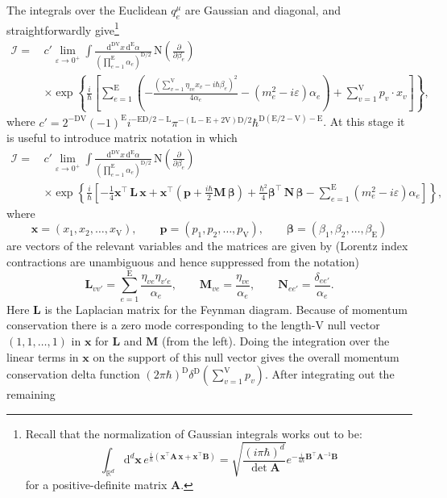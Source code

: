 \documentclass[12pt]{article}
\numberwithin{figure}{section}
\def \be {\begin{equation}}
\def \ee {\end{equation}}
\def \nn {\nonumber}
\def \R {\mathbb{R}}
\def \D {\mathrm{D}}
\def \E {\mathrm{E}}
\def \L {\mathrm{L}}
\def \d {\mathrm{d}}
\def \eps {\varepsilon}
\def \I {\mathcal{I}}
\def \NN {\mathrm{N}}
\def \VV {\mathrm{V}}
\begin{document}
The integrals over the Euclidean $q_e^\mu$ are Gaussian and diagonal, and straightforwardly give\footnote{
Recall that the normalization of Gaussian integrals works out to be:
		\be
		\int_{\R^d} \!\!\!\d^d \mathbf{x}\, e^{\frac{i}{\hbar} \left(\mathbf{x}^\intercal \mathbf{A}\, \mathbf{x} + \mathbf{x}^\intercal \mathbf{B} \right)} = \sqrt{\frac{(i\pi\hbar)^{d}}{\det \mathbf{A}}} e^{-\frac{i}{4\hbar} \mathbf{B}^\intercal \mathbf{A}^{-1} \mathbf{B}}
		\ee
		for a positive-definite
		matrix
		$\mathbf{A}$.
	}
%
\begin{align}\label{eq:int2}
\I = \,& c' \lim_{\eps \to 0^+} \int \!\!\frac{\d^{\D\mathrm{V}} x \, \d^{\E}\alpha}{(\prod_{e=1}^{\E} \!\alpha_e)^{\D/2}}\, \NN(\tfrac{\partial}{\partial \beta_{e}})\\
& \times \exp \left\{ \frac{i}{\hbar}\left[\sum_{e=1}^{\E} \left(- \frac{(\sum_{v=1}^{\mathrm{V}} \eta_{ve} x_v - i\hbar\beta_e)^2}{4\alpha_e} - (m_e^2 - i\eps) \alpha_e \right) + \sum_{v=1}^{\mathrm{V}} p_v {\cdot} x_v \right] \right\} ,\nn
\end{align}
%
where $c' = 2^{-\D\VV}(-1)^\E i^{-\E \D/2-\L} \pi^{-(\L-\E+2\VV)\D/2} \hbar^{\D( \E/2 -\VV)-\E}$.
At this stage it is useful to introduce matrix notation in which
%
\begin{align}
\I = \,&c'\lim_{\eps \to 0^+}\int \frac{\d^{\D\mathrm{V}} x \, \d^{\E}\alpha}{(\prod_{e=1}^{\E}\! \alpha_e)^{\D/2}}\, \NN(\tfrac{\partial}{\partial \beta_{e}}) \\
& \times \exp \left\{ \frac{i}{\hbar}\left[ - \tfrac{1}{4}\mathbf{x}^\intercal\, \mathbf{L}\, \mathbf{x} + \mathbf{x}^\intercal (\mathbf{p} + \tfrac{i\hbar}{2}\mathbf{M}\, \bm{\beta}) + \tfrac{\hbar^2}{4}\bm{\beta}^\intercal\, \mathbf{N}\, \bm{\beta} - \sum_{e=1}^{\E} (m_e^2 - i\eps) \alpha_e \right] \right\},\nn
\end{align}
%
where
%
\be
\mathbf{x} = (x_1, x_2, \ldots, x_\VV), \qquad \mathbf{p} = (p_1, p_2, \ldots, p_\VV), \qquad \bm{\beta} = (\beta_1, \beta_2, \ldots, \beta_{\E})
\ee
%
are vectors of the relevant variables and the matrices are given by (Lorentz index contractions are unambiguous and hence suppressed from the notation)
%
\be\label{eq:LMN}
\mathbf{L}_{v v'} = \sum_{e=1}^{\E} \frac{\eta_{ve} \eta_{v' e}}{\alpha_e}, \qquad \mathbf{M}_{ve} = \frac{\eta_{ve}}{\alpha_e}, \qquad \mathbf{N}_{e e'} = \frac{\delta_{ee'}}{\alpha_e}.
\ee
%
Here $\mathbf{L}$ is the Laplacian matrix for the Feynman diagram. Because of momentum conservation there is a zero mode corresponding to the length-$\mathrm{V}$ null vector $(1,1,\ldots,1)$ in $\mathbf{x}$ for $\mathbf{L}$ and $\mathbf{M}$ (from the left). Doing the integration over the linear terms in $\mathbf{x}$ on the support of this null vector gives the overall momentum conservation delta function $(2\pi \hbar)^{\D} \delta^\D({\textstyle\sum}_{v=1}^{\mathrm{V}} p_v)$. After integrating out the remaining
\end{document}
